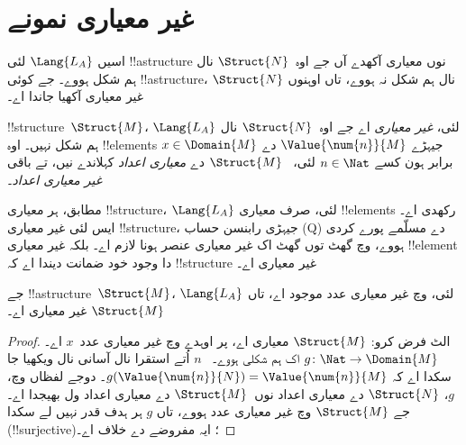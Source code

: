 \documentclass[../../../include/open-logic-section]{subfiles}
\begin{document}
\section{غیر معیاری نمونے}

\begin{explain}
اسیں $\Lang{L_A}$ لئی !!a{structure} نوں معیاری
آکھدے آں جے اوہ~$\Struct{N}$ نال ہم شکل ہووے۔
جے کوئی !!a{structure}، $\Struct{N}$ نال ہم شکل
نہ ہووے، تاں اوہنوں غیر معیاری آکھیا جاندا اے۔
\end{explain}

\begin{defn}
!!{structure}~$\Struct{M}$، $\Lang{L_A}$ لئی،
\emph{غیر معیاری} اے جے اوہ~$\Struct{N}$ نال ہم
شکل نہیں۔ اوہ !!{element}s $x \in
\Domain{M}$ جیہڑے $\Value{\num{n}}{M}$
دے برابر ہون کسے $n \in \Nat$ لئی،
~$\Struct{M}$ دے \emph{معیاری اعداد} کہلاندے نیں،
تے باقی \emph{غیر معیاری اعداد}۔
\end{defn}

\begin{explain}
 مطابق، ہر معیاری
!!{structure}، $\Lang{L_A}$ لئی، صرف معیاری
!!{element}s رکھدی اے۔ ایس لئی غیر معیاری
!!{structure}، جیہڑی رابنسن حساب (Q) دے مسلّمے پورے کردی ہووے،
وچ گھٹ توں گھٹ اک غیر معیاری
عنصر ہونا لازم اے۔ بلکہ غیر معیاری !!{element}
دا وجود خود ضمانت دیندا اے کہ !!{structure}
غیر معیاری اے۔
\end{explain}

\begin{prop}
جے !!a{structure}~$\Struct{M}$، $\Lang{L_A}$ لئی،
وچ غیر معیاری عدد موجود اے، تاں $\Struct{M}$
غیر معیاری اے۔
\end{prop}

\begin{proof}
الٹ فرض کرو: $\Struct{M}$ معیاری اے، پر
اوہدے وچ غیر معیاری عدد~$x$ اے۔
$g\colon \Nat \to \Domain{M}$ اک ہم شکلی ہووے۔
~$n$ اُتے استقرا نال آسانی نال ویکھیا جا سکدا اے کہ
$g(\Value{\num{n}}{N}) = \Value{\num{n}}{M}$۔
دوجے لفظاں وچ، $g$، $\Struct{N}$ دے معیاری
اعداد نوں~$\Struct{M}$ دے معیاری اعداد ول بھیجدا اے۔
جے $\Struct{M}$ وچ غیر معیاری عدد ہووے، تاں $g$
ہر ہدف قدر نہیں لے سکدا (!!{surjective})؛ ایہ مفروضے
دے خلاف اے۔
\end{proof}
\end{document}
